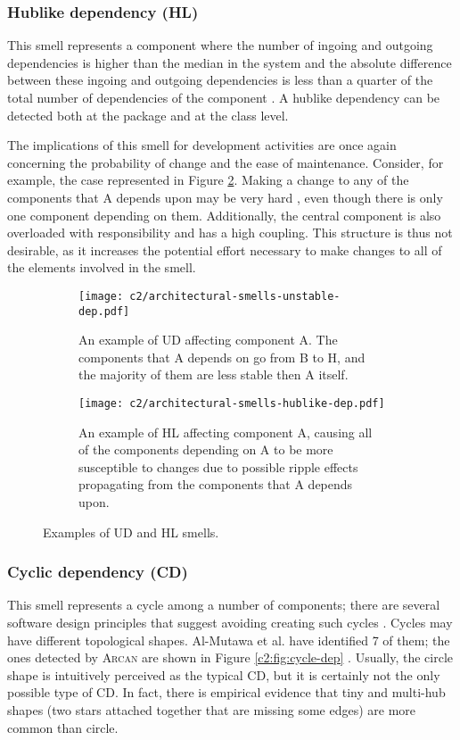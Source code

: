 \subsubsection{Hublike dependency (HL)}\label{c2:sec:arch-smells-hl}
This smell represents a component where the number of ingoing and outgoing dependencies is higher than the median in the system and the absolute difference between these ingoing and outgoing dependencies is less than a quarter of the total number of dependencies of the component \cite{Arcelli2016}. A hublike dependency can be detected both at the package and at the class level.

The implications of this smell for development activities are once again concerning the probability of change and the ease of maintenance. Consider, for example, the case represented in Figure \ref{c2:fig:hublike-dep}.
Making a change to any of the components that A depends upon may be very hard \cite{Martin2018}, even though there is only one component depending on them.
Additionally, the central component is also overloaded with responsibility and has a high coupling.
This structure is thus not desirable, as it increases the potential effort necessary to make changes to all of the elements involved in the smell.
\begin{figure}
    \centering
	\begin{subfigure}[b]{0.85\linewidth}
		\centering
		\texttt{[image: c2/architectural-smells-unstable-dep.pdf]}
		\caption{An example of UD affecting component A. The components that A depends on go from B to H, and the majority of them are less stable then A itself.}\label{c2:fig:unstable-dep}
	\end{subfigure}
	\begin{subfigure}[b]{0.85\linewidth}
		\centering
		\texttt{[image: c2/architectural-smells-hublike-dep.pdf]}
		\caption{An example of HL affecting component A, causing all of the components depending on A to be more susceptible to changes due to possible ripple effects propagating from the components that A  depends upon.}\label{c2:fig:hublike-dep}
	\end{subfigure} 
    \caption{Examples of UD and HL smells.}
    \label{c2:fig:architectural smells} 
\end{figure}

\subsubsection{Cyclic dependency (CD)}\label{c2:sec:arch-smells-cd}
This smell represents a cycle among a number of components; there are several software design principles that suggest avoiding creating such cycles \cite{Lippert2006,Parnas1979,Stevens1974,Martin2018}.
Cycles may have different topological shapes. Al-Mutawa et al. \cite{AlMutawa2014} have identified 7 of them; the ones detected by \textsc{Arcan} are shown in Figure \ref{c2:fig:cycle-dep} \cite{Arcelli2017}.
Usually, the circle shape is intuitively perceived as the typical CD, but it is certainly not the only possible type of CD. In fact, there is empirical evidence \cite{AlMutawa2014} that tiny and multi-hub shapes (two stars attached together that are missing some edges) are more common than circle.


